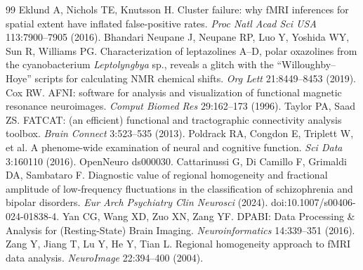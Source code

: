 \documentclass[11pt]{article}
\begin{document}
\begin{thebibliography}{99}
 Eklund A, Nichols TE, Knutsson H. Cluster failure: why fMRI inferences for spatial extent have inflated false-positive rates. \emph{Proc Natl Acad Sci USA} 113:7900--7905 (2016).
 Bhandari Neupane J, Neupane RP, Luo Y, Yoshida WY, Sun R, Williams PG. Characterization of leptazolines A--D, polar oxazolines from the cyanobacterium \emph{Leptolyngbya} sp., reveals a glitch with the ``Willoughby--Hoye'' scripts for calculating NMR chemical shifts. \emph{Org Lett} 21:8449--8453 (2019).
 Cox RW. AFNI: software for analysis and visualization of functional magnetic resonance neuroimages. \emph{Comput Biomed Res} 29:162--173 (1996).
 Taylor PA, Saad ZS. FATCAT: (an efficient) functional and tractographic connectivity analysis toolbox. \emph{Brain Connect} 3:523--535 (2013).
 Poldrack RA, Congdon E, Triplett W, et al. A phenome-wide examination of neural and cognitive function. \emph{Sci Data} 3:160110 (2016). OpenNeuro ds000030.
 Cattarinussi G, Di Camillo F, Grimaldi DA, Sambataro F. Diagnostic value of regional homogeneity and fractional amplitude of low-frequency fluctuations in the classification of schizophrenia and bipolar disorders. \emph{Eur Arch Psychiatry Clin Neurosci} (2024). doi:10.1007/s00406-024-01838-4.
 Yan CG, Wang XD, Zuo XN, Zang YF. DPABI: Data Processing \& Analysis for (Resting-State) Brain Imaging. \emph{Neuroinformatics} 14:339--351 (2016).
 Zang Y, Jiang T, Lu Y, He Y, Tian L. Regional homogeneity approach to fMRI data analysis. \emph{NeuroImage} 22:394--400 (2004).
\end{thebibliography}
\end{document}
